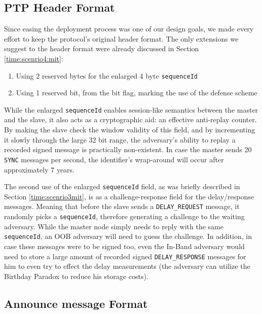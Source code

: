 \documentclass[11pt]{article}
\begin{document}
\subsection{PTP Header Format}\label{sol:header}

Since easing the deployment process was one of our design goals, we made every effort to keep the protocol's original header format. The only extensions we suggest to the header format were already discussed in Section \ref{time:scenrio4:mit}:

\begin{enumerate}

  \item Using 2 reserved bytes for the enlarged 4 byte \texttt{sequenceId}

  \item Using 1 reserved bit, from the bit flag, marking the use of the defense scheme

\end{enumerate}



While the enlarged \texttt{sequenceId} enables session-like semantics between the master and the slave, it also acts as a cryptographic aid: an effective anti-replay counter. By making the slave check the window validity of this field, and by incrementing it slowly through the large 32 bit range, the adversary's ability to replay a recorded signed message is practically non-existent. In case the master sends 20 \texttt{SYNC} messages per second, the identifier's wrap-around will occur after approximately 7 years.



The second use of the enlarged \texttt{sequenceId} field, as was briefly described in Section \ref{time:scenrio3mit}, is as a challenge-response field for the delay/response messages. Meaning that before the slave sends a \texttt{DELAY_REQUEST} message, it randomly picks a \texttt{sequenceId}, therefore generating a challenge to the waiting adversary. While the master node simply needs to reply with the same \texttt{sequenceId}, an OOB adversary will need to guess the challenge. In addition, in case these messages were to be signed too, even the In-Band adversary would need to store a large amount of recorded signed \texttt{DELAY_RESPONSE} messages for him to even try to effect the delay measurements (the adversary can utilize the Birthday Paradox to reduce his storage costs).



\subsection{Announce message Format}\label{sol:announce}
\end{document}
